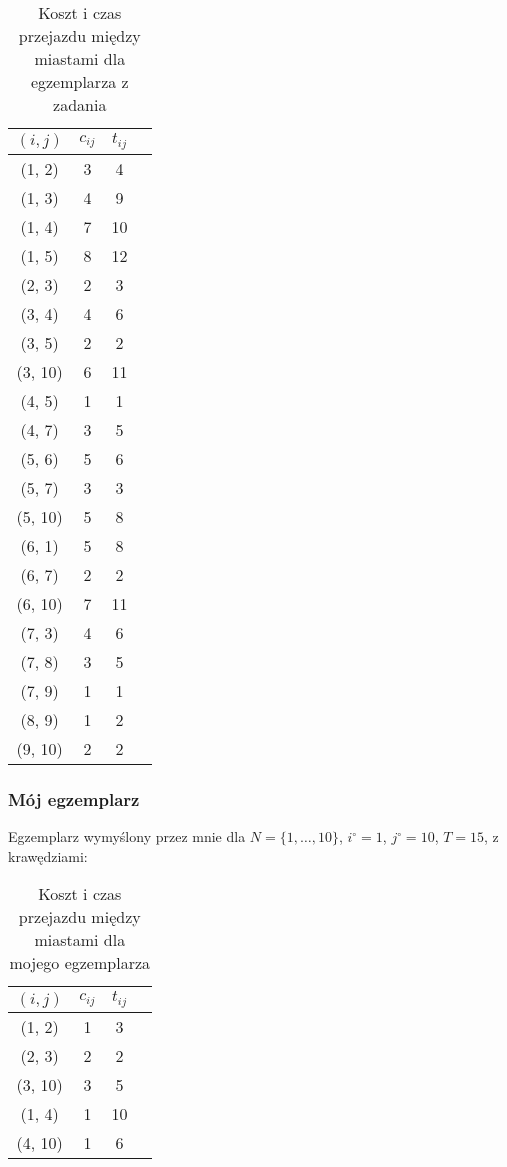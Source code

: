 \documentclass{article}
\begin{document}
\begin{table}[H]
\centering
\begin{tabular}{|c|c|c|c|}
\hline
$(i, j)$ & $c_{ij}$ & $t_{ij}$ \\
\hline
(1, 2) & 3 & 4 \\
(1, 3) & 4 & 9 \\
(1, 4) & 7 & 10 \\
(1, 5) & 8 & 12 \\
(2, 3) & 2 & 3 \\
(3, 4) & 4 & 6 \\
(3, 5) & 2 & 2 \\
(3, 10) & 6 & 11 \\
(4, 5) & 1 & 1 \\
(4, 7) & 3 & 5 \\
(5, 6) & 5 & 6 \\
(5, 7) & 3 & 3 \\
(5, 10) & 5 & 8 \\
(6, 1) & 5 & 8 \\
(6, 7) & 2 & 2 \\
(6, 10) & 7 & 11 \\
(7, 3) & 4 & 6 \\
(7, 8) & 3 & 5 \\
(7, 9) & 1 & 1 \\
(8, 9) & 1 & 2 \\
(9, 10) & 2 & 2 \\
\hline
\end{tabular}
\caption{Koszt i czas przejazdu między miastami dla egzemplarza z zadania}
\end{table}

\subsubsection{Mój egzemplarz}
Egzemplarz wymyślony przez mnie dla $N = \{1, \ldots, 10\}$, $i^\circ = 1$, $j^\circ = 10$, $T = 15$, z krawędziami:

\begin{table}[H]
\centering
\begin{tabular}{|c|c|c|c|}
\hline
$(i, j)$ & $c_{ij}$ & $t_{ij}$ \\
\hline
(1, 2) & 1 & 3 \\
(2, 3) & 2 & 2 \\
(3, 10) & 3 & 5 \\
(1, 4) & 1 & 10 \\
(4, 10) & 1 & 6 \\
\hline
\end{tabular}
\caption{Koszt i czas przejazdu między miastami dla mojego egzemplarza}
\label{tab:edges}
\end{table}
\end{document}
